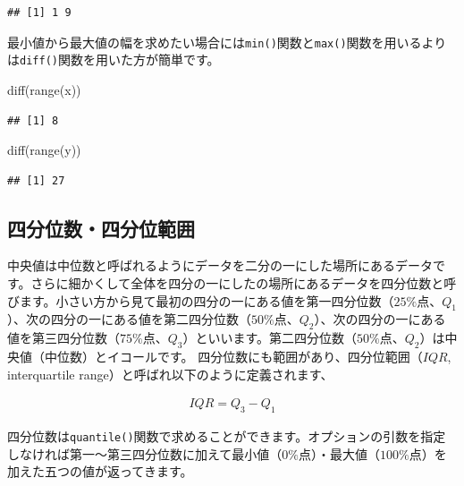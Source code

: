 \documentclass[
  12pt,
]{book}
\newenvironment{Shaded}{\begin{snugshade}}{\end{snugshade}}
\newcommand{\FunctionTok}[1]{\textcolor[rgb]{0.00,0.00,0.00}{#1}}
\newcommand{\NormalTok}[1]{#1}
\begin{document}
\begin{verbatim}
## [1] 1 9
\end{verbatim}

最小値から最大値の幅を求めたい場合には\texttt{min()}関数と\texttt{max()}関数を用いるよりは\texttt{diff()}関数を用いた方が簡単です。

\begin{Shaded}
\begin{Highlighting}[numbers=left,,]
\FunctionTok{diff}\NormalTok{(}\FunctionTok{range}\NormalTok{(x))}
\end{Highlighting}
\end{Shaded}

\begin{verbatim}
## [1] 8
\end{verbatim}

\begin{Shaded}
\begin{Highlighting}[numbers=left,,]
\FunctionTok{diff}\NormalTok{(}\FunctionTok{range}\NormalTok{(y))}
\end{Highlighting}
\end{Shaded}

\begin{verbatim}
## [1] 27
\end{verbatim}

\hypertarget{ux56dbux5206ux4f4dux6570ux56dbux5206ux4f4dux7bc4ux56f2}{%
\subsection{四分位数・四分位範囲}\label{ux56dbux5206ux4f4dux6570ux56dbux5206ux4f4dux7bc4ux56f2}}

中央値は中位数と呼ばれるようにデータを二分の一にした場所にあるデータです。さらに細かくして全体を四分の一にしたの場所にあるデータを四分位数と呼びます。小さい方から見て最初の四分の一にある値を第一四分位数（\(25\%\)点、\(Q_1\)）、次の四分の一にある値を第二四分位数（\(50\%\)点、\(Q_2\)）、次の四分の一にある値を第三四分位数（\(75\%\)点、\(Q_3\)）といいます。第二四分位数（\(50\%\)点、\(Q_2\)）は中央値（中位数）とイコールです。 四分位数にも範囲があり、四分位範囲（\(IQR\), interquartile range）と呼ばれ以下のように定義されます、

\begin{align}
  IQR = Q_3 - Q_1 \label{eq:IQR}
\end{align}

四分位数は\texttt{quantile()}関数で求めることができます。オプションの引数を指定しなければ第一〜第三四分位数に加えて最小値（\(0\%点\)）・最大値（\(100\%点\)）を加えた五つの値が返ってきます。
\end{document}

